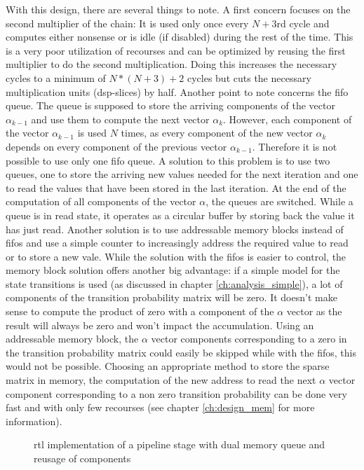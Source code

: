 \documentclass[mscthesis]{usiinfthesis}
\begin{document}
With this design, there are several things to note. A first concern focuses on
the second multiplier of the chain: It is used only once every $N+3$rd cycle
and computes either nonsense or is idle (if disabled) during the rest of the
time.  This is a very poor utilization of recourses and can be optimized by
reusing the first multiplier to do the second multiplication. Doing this
increases the necessary cycles to a minimum of $N*(N+3)+2$ cycles but cuts the
necessary multiplication units (\gls{dsp}-slices) by half. Another point to
note concerns the \gls{fifo} queue. The queue is supposed to store the arriving
components of the vector $\alpha_{k-1}$ and use them to compute the next vector
$\alpha_k$.  However, each component of the vector $\alpha_{k-1}$ is used $N$
times, as every component of the new vector $\alpha_k$ depends on every
component of the previous vector $\alpha_{k-1}$. Therefore it is not possible
to use only one \gls{fifo} queue. A solution to this problem is to use two
queues, one to store the arriving new values needed for the next iteration and
one to read the values that have been stored in the last iteration. At the end
of the computation of all components of the vector $\alpha$, the queues are
switched.  While a queue is in read state, it operates as a circular buffer by
storing back the value it has just read. Another solution is to use addressable
memory blocks instead of \glspl{fifo} and use a simple counter to increasingly
address the required value to read or to store a new vale. While the solution
with the \glspl{fifo} is easier to control, the memory block solution offers
another big advantage: if a simple model for the state transitions is used (as
discussed in chapter \ref{ch:analysis_simple}), a lot of components of the
transition probability matrix will be zero. It doesn't make sense to compute
the product of zero with a component of the $\alpha$ vector as the result will
always be zero and won't impact the accumulation. Using an addressable memory
block, the $\alpha$ vector components corresponding to a zero in the transition
probability matrix could easily be skipped while with the \glspl{fifo}, this
would not be possible. Choosing an appropriate method to store the sparse
matrix in memory, the computation of the new address to read the next $\alpha$
vector component corresponding to a non zero transition probability can be done
very fast and with only few recourses (see chapter \ref{ch:design_mem} for more
information).

\begin{figure}
    \centering
    
    \caption{\acrshort{rtl} implementation of a pipeline stage with dual memory queue and
        reusage of components}
    \label{fig:arch_step}
\end{figure}
\end{document}
